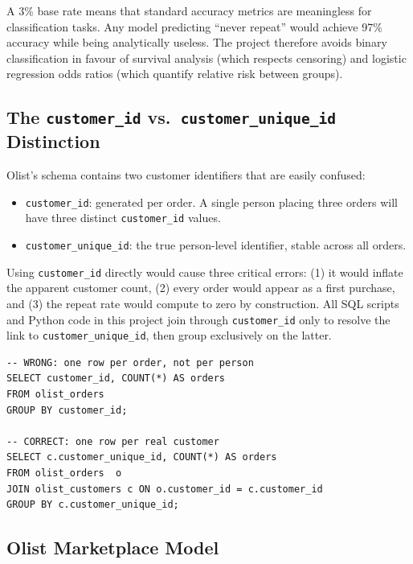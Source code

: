 \begin{keyinsight}
A 3\% base rate means that standard accuracy metrics are meaningless for
classification tasks. Any model predicting ``never repeat'' would achieve 97\%
accuracy while being analytically useless. The project therefore avoids binary
classification in favour of survival analysis (which respects censoring) and
logistic regression odds ratios (which quantify relative risk between groups).
\end{keyinsight}

\subsection{The \texttt{customer\_id} vs.\ \texttt{customer\_unique\_id} Distinction}

Olist's schema contains two customer identifiers that are easily confused:

\begin{itemize}
  \item \texttt{customer\_id}: generated per order. A single person placing three
    orders will have three distinct \texttt{customer\_id} values.
  \item \texttt{customer\_unique\_id}: the true person-level identifier, stable
    across all orders.
\end{itemize}

Using \texttt{customer\_id} directly would cause three critical errors: (1) it
would inflate the apparent customer count, (2) every order would appear as a
first purchase, and (3) the repeat rate would compute to zero by construction.
All SQL scripts and Python code in this project join through
\texttt{customer\_id} only to resolve the link to \texttt{customer\_unique\_id},
then group exclusively on the latter.

\begin{lstlisting}[style=sql, caption={Wrong vs.\ correct customer grouping}]
-- WRONG: one row per order, not per person
SELECT customer_id, COUNT(*) AS orders
FROM olist_orders
GROUP BY customer_id;

-- CORRECT: one row per real customer
SELECT c.customer_unique_id, COUNT(*) AS orders
FROM olist_orders  o
JOIN olist_customers c ON o.customer_id = c.customer_id
GROUP BY c.customer_unique_id;
\end{lstlisting}

\subsection{Olist Marketplace Model}

